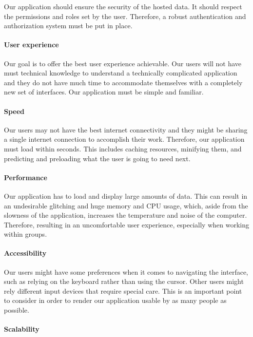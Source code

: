 Our application should ensure the security of the hosted data. It should respect the permissions and roles set by the user. Therefore, a robust authentication and authorization system must be put in place.

\paragraph{User experience}

Our goal is to offer the best user experience achievable. Our users will not have must technical knowledge to understand a technically complicated application and they do not have much time to accommodate themselves with a completely new set of interfaces. Our application must be simple and familiar.

\paragraph{Speed}

Our users may not have the best internet connectivity and they might be sharing a single internet connection to accomplish their work. Therefore, our application must load within seconds. This includes caching resources, minifying them, and predicting and preloading what the user is going to need next.

\paragraph{Performance}

Our application has to load and display large amounts of data. This can result in an undesirable glitching and huge memory and CPU usage, which, aside from the slowness of the application, increases the temperature and noise of the computer. Therefore, resulting in an uncomfortable user experience, especially when working within groups.

\paragraph{Accessibility}

Our users might have some preferences when it comes to navigating the interface, such as relying on the keyboard rather than using the cursor. Other users might rely different input devices that require special care. This is an important point to consider in order to render our application usable by as many people as possible.

\paragraph{Scalability}

